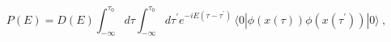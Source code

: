 \begin{equation}\label{l81-01}
P(E)=D(E)\int _{-\infty}^{\tau _0}d\tau \int _{-\infty}^{\tau _0}d\tau ^{'}e^{-iE(\tau -\tau ^{'})}\,\langle 0|\phi(x(\tau))\phi(x(\tau ^{'}))|0\rangle~,
\end{equation}

